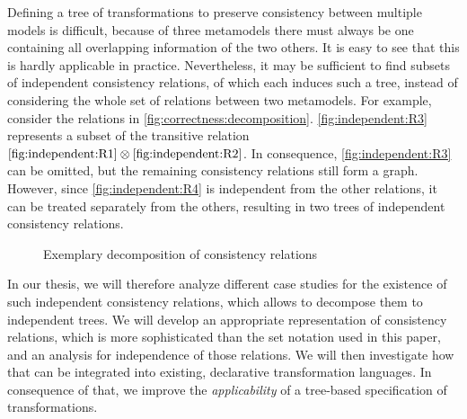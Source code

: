 Defining a tree of transformations to preserve consistency between multiple models is difficult, because of three metamodels there must always be one containing all overlapping information of the two others.
It is easy to see that this is hardly applicable in practice.
Nevertheless, it may be sufficient to find subsets of independent consistency relations, of which each induces such a tree, instead of considering the whole set of relations between two metamodels.
For example, consider the relations in \autoref{fig:correctness:decomposition}.
\ref{fig:independent:R3} represents a subset of the transitive relation $\mbox{\ref{fig:independent:R1}} \otimes \mbox{\ref{fig:independent:R2}}$.
In consequence, \ref{fig:independent:R3} can be omitted, but the remaining consistency relations still form a graph.
However, since \ref{fig:independent:R4} is independent from the other relations, it can be treated separately from the others, resulting in two trees of independent consistency relations.

\begin{figure}
    \centering
    
    \caption{Exemplary decomposition of consistency relations}
    \label{fig:correctness:decomposition}
\end{figure}

In our thesis, we will therefore analyze different case studies for the existence of such independent consistency relations, which allows to decompose them to independent trees.
We will develop an appropriate representation of consistency relations, which is more sophisticated than the set notation used in this paper, and an analysis for independence of those relations.
We will then investigate how that can be integrated into existing, declarative transformation languages.
In consequence of that, we improve the \emph{applicability} of a tree-based specification of transformations.



